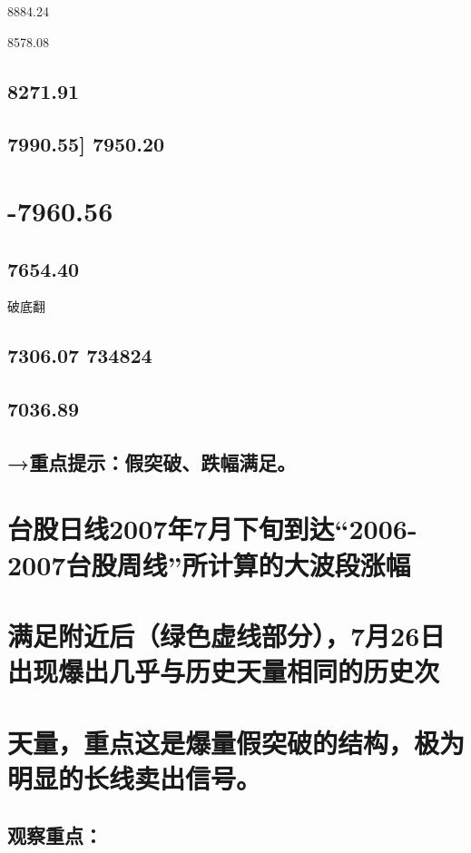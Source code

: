 \documentclass{article}
\begin{document}
8884.24

8578.08

\subsection{8271.91}

\subsection{7990.55] 7950.20}

\section{-7960.56}

\subsection{7654.40}

破底翻

\subsection{7306.07 734824}

\subsection{7036.89}

\subsection{→重点提示：假突破、跌幅满足。}

\section{台股日线2007年7月下旬到达“2006-2007台股周线”所计算的大波段涨幅}

\section{满足附近后（绿色虚线部分），7月26日出现爆出几乎与历史天量相同的历史次}

\section{天量，重点这是爆量假突破的结构，极为明显的长线卖出信号。}

\subsection{观察重点：}
\end{document}
